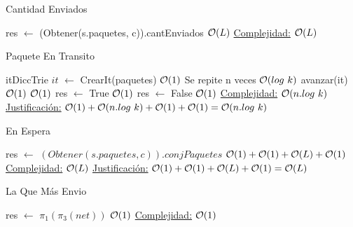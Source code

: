 \begin{Algoritmos}
\begin{algorithm}
\caption{Cantidad Enviados}
\begin{algorithmic}[1]
   \State res $\gets$ (Obtener(s.paquetes, c)).cantEnviados \Comment $\mathcal{O}(L)$
  \EndProcedure
   \underline{Complejidad:} $\mathcal{O}(L)$
\end{algorithmic}
\end{algorithm}


\begin{algorithm}
\caption{Paquete En Transito}
\begin{algorithmic}[1]
   \State itDiccTrie $it$ $\gets$ CrearIt(paquetes) \Comment $\mathcal{O}(1)$
    \Comment Se repite n veces $\mathcal{O}(log \ k)$ 
   \State avanzar(it) \Comment $\mathcal{O}(1)$
	\EndWhile  
	 \Comment $\mathcal{O}(1)$
	\State res $\gets$   True \Comment $\mathcal{O}(1)$
	\Else  
	\State res $\gets$ False \Comment $\mathcal{O}(1)$
	\EndIf 
  \EndProcedure
    \underline{Complejidad:} $\mathcal{O}(n.log \ k)$
 \underline{Justificación:} $\mathcal{O}(1)+\mathcal{O}(n.log \ k )+\mathcal{O}(1)+\mathcal{O}(1) = \mathcal{O}(n.log \ k)$
\end{algorithmic}
\end{algorithm}




\begin{algorithm}
\caption{En Espera}
\begin{algorithmic}[1]
    \State res $\gets$ $(Obtener(s.paquetes,c)).conjPaquetes$ \Comment $\mathcal{O}(1)+\mathcal{O}(1)+\mathcal{O}(L)+\mathcal{O}(1)$
  \EndProcedure
  \underline{Complejidad:} $\mathcal{O}(L)$
 \underline{Justificación:} $\mathcal{O}(1)+\mathcal{O}(1)+\mathcal{O}(L)+\mathcal{O}(1) = \mathcal{O}(L)$

\end{algorithmic}
\end{algorithm}


\begin{algorithm}
\caption{La Que Más Envio}
\begin{algorithmic}[1]
   \State res $\gets$   $\pi_1(\pi_3(net))$ \Comment $\mathcal{O}(1)$
  \EndProcedure
  \underline{Complejidad:} $\mathcal{O}(1)$
\end{algorithmic}
\end{algorithm}



\end{Algoritmos}

